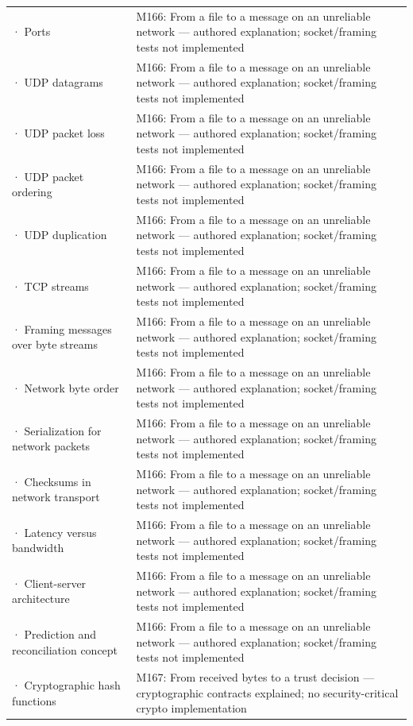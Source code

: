 {\begin{longtable}[]{@{}
  >{\raggedright\arraybackslash}p{}
  >{\raggedright\arraybackslash}p{}@{}}
2758 · Ports & M166: From a file to a message on an unreliable network --- authored explanation; socket/framing tests not implemented \\
2759 · UDP datagrams & M166: From a file to a message on an unreliable network --- authored explanation; socket/framing tests not implemented \\
2760 · UDP packet loss & M166: From a file to a message on an unreliable network --- authored explanation; socket/framing tests not implemented \\
2761 · UDP packet ordering & M166: From a file to a message on an unreliable network --- authored explanation; socket/framing tests not implemented \\
2762 · UDP duplication & M166: From a file to a message on an unreliable network --- authored explanation; socket/framing tests not implemented \\
2763 · TCP streams & M166: From a file to a message on an unreliable network --- authored explanation; socket/framing tests not implemented \\
2764 · Framing messages over byte streams & M166: From a file to a message on an unreliable network --- authored explanation; socket/framing tests not implemented \\
2765 · Network byte order & M166: From a file to a message on an unreliable network --- authored explanation; socket/framing tests not implemented \\
2766 · Serialization for network packets & M166: From a file to a message on an unreliable network --- authored explanation; socket/framing tests not implemented \\
2767 · Checksums in network transport & M166: From a file to a message on an unreliable network --- authored explanation; socket/framing tests not implemented \\
2768 · Latency versus bandwidth & M166: From a file to a message on an unreliable network --- authored explanation; socket/framing tests not implemented \\
2769 · Client-server architecture & M166: From a file to a message on an unreliable network --- authored explanation; socket/framing tests not implemented \\
2770 · Prediction and reconciliation concept & M166: From a file to a message on an unreliable network --- authored explanation; socket/framing tests not implemented \\
2771 · Cryptographic hash functions & M167: From received bytes to a trust decision --- cryptographic contracts explained; no security-critical crypto implementation \\

\end{longtable}}

